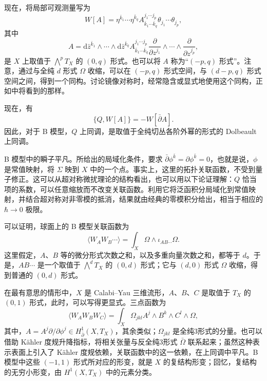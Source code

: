 现在，将局部可观测量写为
\begin{equation}\label{eq:3.126}
W[A]=\eta^{\bar k_1}\cdots\eta^{\bar k_q}
A_{\bar k_1\cdots\bar k_q}^{j_1\cdots j_p}
\theta_{j_1}\cdots\theta_{j_p},
\end{equation}
其中
\begin{equation}\label{eq:3.127}
A=\mathrm{d}\bar z^{\bar k_1}\wedge\cdots\wedge\mathrm{d}\bar z^{\bar k_q}
A_{\bar k_1\cdots\bar k_q}^{j_1\cdots j_p}
\frac{\partial}{\partial z^{j_1}}\wedge\cdots\wedge
\frac{\partial}{\partial z^{j_p}},
\end{equation}
是 $X$ 上取值于 $\bigwedge^pT_X$ 的 $(0,q)$ 形式。也可以将 $A$ 称为“$(-p,q)$ 形式”。注意，通过与全纯 $d$ 形式 $\Omega$ 收缩，可以在 $(-p,q)$ 形式空间，与 $(d-p,q)$ 形式空间之间，得到一个同构。讨论镜像对称时，经常隐含或显式地使用这个同构，正如中将看到的那样。

现在，有
\begin{equation}\label{eq:3.128}
\{Q,W[A]\}=-W[\bar\partial A].
\end{equation}
因此，对于 B 模型，$Q$ 上同调，是取值于全纯切丛各阶外幂的形式的 Dolbeault 上同调。

B 模型中的瞬子平凡。所给出的局域化条件，要求 $\bar\partial\phi^{\bar k}=\partial\phi^{\bar k}=0$，也就是说，$\phi$ 是常值映射，将 $\Sigma$ 映到 $X$ 中的一个点。事实上，这里的拓扑关联函数，不受到量子修正。这可以从超对称微扰理论的结构看出，也可以用以下论证理解：$Q$ 恰当项的系数，可以任意缩放而不改变关联函数。利用它将泛函积分局域化到常值映射，并结合超对称对非零模的抵消，结果就由经典的零模积分给出，相当于相应的 $\hbar\to0$ 极限。

可以证明，球面上的 B 模型关联函数为
\[
\langle W_AW_B\cdots\rangle
=\int_X\Omega\wedge\iota_{AB\cdots}\Omega.
\]
这里假定，$A$、$B$ 等的微分形式次数之和，以及多重向量次数之和，都等于 $d$。于是，$AB\cdots$ 是一个取值于 $\bigwedge^dT_X$ 的 $(0,d)$ 形式；它与 $(d,0)$ 形式 $\Omega$ 收缩，得到普通的 $(0,d)$ 形式。

在最有意思的情形中，$X$ 是 Calabi--Yau 三维流形，$A$、$B$、$C$ 是取值于 $T_X$ 的 $(0,1)$ 形式，此时，可以写得更显式。三点函数为
\begin{equation}\label{eq:3.129}
\langle W_AW_BW_C\rangle
=\int_X\Omega_{jkl}A^j\wedge B^k\wedge C^l\wedge\Omega,
\end{equation}
其中，$A=A^j\partial/\partial\phi^j\in H^1_{\bar\partial}(X,T_X)$，其余类似；$\Omega_{jkl}$ 是全纯3形式的分量。也可以借助 K\"ahler 度规升降指标，将相关张量与反全纯3形式 $\bar\Omega$ 联系起来；虽然这种表示表面上引入了 K\"ahler 度规依赖，关联函数中的这一依赖，在上同调中平凡。B 模型中这些 $(-1,1)$ 形式所对应的形变，就是 $X$ 的复结构形变；回忆，复结构的无穷小形变，由 $H^1(X,T_X)$ 中的元素分类。

